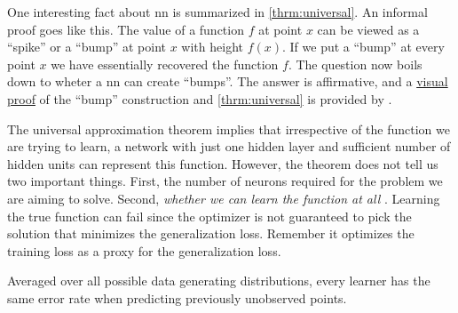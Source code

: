 One interesting fact about \gls{nn} is summarized in \Theorem{}
\ref{thrm:universal}. An informal proof goes like this. The value of a function
$f$ at point $x$ can be viewed as a ``spike'' or a ``bump'' at point $x$ with
height $f(x)$. If we put a ``bump'' at every point $x$ we have essentially recovered
the function $f$. The question now boils down to wheter a \gls{nn} can create
``bumps''. The answer is affirmative, and a
\href{http://neuralnetworksanddeeplearning.com/chap4.html}{visual proof} of the
``bump'' construction and \Theorem{} \ref{thrm:universal} is provided by
\cite{Nielsen2018}.

The universal approximation theorem implies that irrespective
of the function we are trying to learn, a network with just one hidden layer and
sufficient number of hidden units can represent this function. However, the
theorem does not tell us two important things. First, the number of neurons
required for the problem we are aiming to solve. Second, \emph{whether we can
learn the function at all} \parencite{deeplearning}. Learning the true function
can fail since the optimizer is not guaranteed to pick the solution that
minimizes the generalization loss. Remember it
optimizes the training loss as a proxy for the
generalization loss.

\begin{theorem}
	\label{thrm:nfl}
	Averaged over all possible data generating distributions, every learner has the same error
	rate when predicting previously unobserved points.
\end{theorem}

